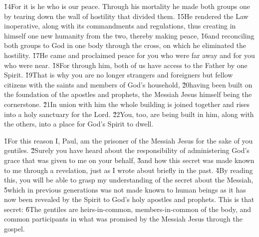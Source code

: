 \v{14}For it is he who is our peace. Through his mortality he made both groups one by tearing down the wall of hostility that divided them. \v{15}He rendered the Law inoperative, along with its commandments and regulations, thus creating in himself one new humanity from the two, thereby making peace, \v{16}and reconciling both groups to God in one body through the cross, on which he eliminated the hostility. \v{17}He came and proclaimed peace for you who were far away and for you who were near. \v{18}For through him, both of us have access to the Father by one Spirit. \v{19}That is why you are no longer strangers and foreigners but fellow citizens with the saints and members of God's household, \v{20}having been built on the foundation of the apostles and prophets, the Messiah Jesus himself being the cornerstone. \v{21}In union with him the whole building is joined together and rises into a holy sanctuary for the Lord. \v{22}You, too, are being built in him, along with the others, into a place for God's Spirit to dwell.

\v{1}For this reason I, Paul, am the prisoner of the Messiah Jesus for the sake of you gentiles. \v{2}Surely you have heard about the responsibility of administering God's grace that was given to me on your behalf, \v{3}and how this secret was made known to me through a revelation, just as I wrote about briefly in the past. \v{4}By reading this, you will be able to grasp my understanding of the secret about the Messiah, \v{5}which in previous generations was not made known to human beings as it has now been revealed by the Spirit to God's holy apostles and prophets. This is that secret: \v{6}The gentiles are heirs-in-common, members-in-common of the body, and common participants in what was promised by the Messiah Jesus through the gospel.

